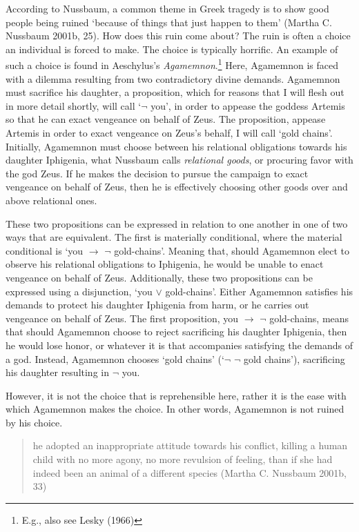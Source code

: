 \documentclass[12pt]{book}
\theoremstyle{definition}
\theoremstyle{remark}
\begin{document}
According to Nussbaum, a common theme in Greek tragedy is to show good people being ruined `because of things that just happen to them' (Martha C. Nussbaum 2001b, 25). How does this ruin come about? The ruin is often a choice an individual is forced to make. The choice is typically horrific. An example of such a choice is found in Aeschylus's \emph{Agamemnon}.\footnote{E.g., also see Lesky (1966)} Here, Agamemnon is faced with a dilemma resulting from two contradictory divine demands. Agamemnon must sacrifice his daughter, a proposition, which for reasons that I will flesh out in more detail shortly, will call `\(\lnot\) you', in order to appease the goddess Artemis so that he can exact vengeance on behalf of Zeus. The proposition, appease Artemis in order to exact vengeance on Zeus's behalf, I will call `gold chains'. Initially, Agamemnon must choose between his relational obligations towards his daughter Iphigenia, what Nussbaum calls \emph{relational goods}, or procuring favor with the god Zeus. If he makes the decision to pursue the campaign to exact vengeance on behalf of Zeus, then he is effectively choosing other goods over and above relational ones.

These two propositions can be expressed in relation to one another in one of two ways that are equivalent. The first is materially conditional, where the material conditional is `you \(\rightarrow\) \(\lnot\) gold-chains'. Meaning that, should Agamemnon elect to observe his relational obligations to Iphigenia, he would be unable to enact vengeance on behalf of Zeus. Additionally, these two propositions can be expressed using a disjunction, `you \(\lor\) gold-chains'. Either Agamemnon satisfies his demands to protect his daughter Iphigenia from harm, or he carries out vengeance on behalf of Zeus. The first proposition, you \(\rightarrow\) \(\lnot\) gold-chains, means that should Agamemnon choose to reject sacrificing his daughter Iphigenia, then he would lose honor, or whatever it is that accompanies satisfying the demands of a god. Instead, Agamemnon chooses `gold chains' (`\(\lnot\) \(\lnot\) gold chains'), sacrificing his daughter resulting in \(\lnot\) you.

However, it is not the choice that is reprehensible here, rather it is the ease with which Agamemnon makes the choice. In other words, Agamemnon is not ruined by his choice.

\begin{quote}
he adopted an inappropriate attitude towards his conflict, killing a human child with no more agony, no more revulsion of feeling, than if she had indeed been an animal of a different species (Martha C. Nussbaum 2001b, 33)
\end{quote}
\end{document}
